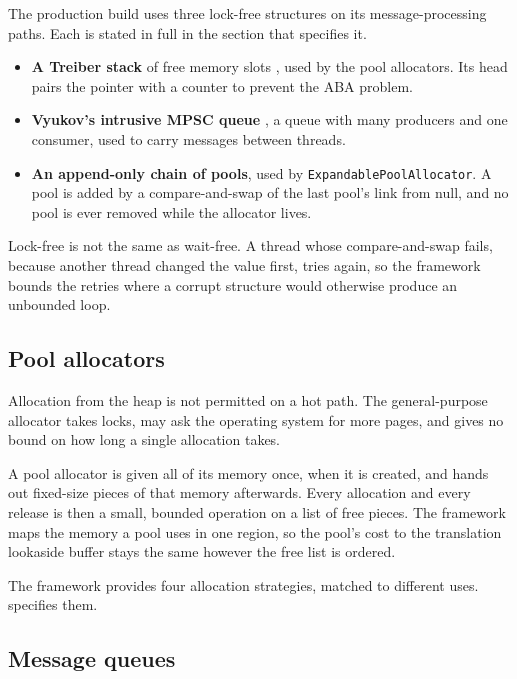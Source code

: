 The production build uses three lock-free structures on its message-processing
paths. Each is stated in full in the section that specifies it.

\begin{itemize}[nosep]
  \item \textbf{A Treiber stack} of free memory slots
        \cite{treiber1986parallelism}, used by the pool allocators. Its head
        pairs the pointer with a counter to prevent the ABA problem.
  \item \textbf{Vyukov's intrusive MPSC queue}
        \cite{vyukov_mpsc_queue}, a queue with many producers and one
        consumer, used to carry messages between threads.
  \item \textbf{An append-only chain of pools}, used by
        \texttt{ExpandablePoolAllocator}. A pool is added by a
        compare-and-swap of the last pool's link from null, and no pool is
        ever removed while the allocator lives.
\end{itemize}

Lock-free is not the same as wait-free. A thread whose compare-and-swap fails,
because another thread changed the value first, tries again, so the framework
bounds the retries where a corrupt structure would otherwise produce an
unbounded loop.

\subsection{Pool allocators}
\label{sec:fw_pool_allocators}

Allocation from the heap is not permitted on a hot path. The general-purpose
allocator takes locks, may ask the operating system for more pages, and gives
no bound on how long a single allocation takes.

A pool allocator is given all of its memory once, when it is created, and hands
out fixed-size pieces of that memory afterwards. Every allocation and every
release is then a small, bounded operation on a list of free pieces. The
framework maps the memory a pool uses in one region, so the pool's cost to the
translation lookaside buffer stays the same however the free list is ordered.

The framework provides four allocation strategies, matched to different uses.
 specifies them.

\subsection{Message queues}
\label{sec:fw_message_queues}

